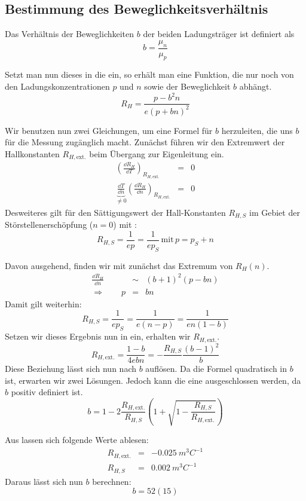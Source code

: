 \subsection{Bestimmung des Beweglichkeitsverhältnis}
Das Verhältnis der Beweglichkeiten $b$ der beiden Ladungsträger ist definiert als
\begin{equation}
 b = \frac{μ_n}{μ_p}
\end{equation}

Setzt man nun dieses in die  ein, so erhält man eine Funktion,
die nur noch von den Ladungskonzentrationen $p$ und $n$ sowie der Beweglichkeit $b$
abhängt.
\begin{equation}
 R_H = \frac{p-b^2n}{e(p+bn)^2}
 \label{eqn:hallkonst_b}
\end{equation}

Wir benutzen nun zwei Gleichungen, um eine Formel für $b$ herzuleiten, die uns
$b$ für die Messung zugänglich macht.
Zunächst führen wir den Extremwert der Hallkonstanten $R_{H,\mbox{ext.}}$ beim
Übergang zur Eigenleitung ein.
\begin{eqnarray}
 \left(\frac{\dd{R_H}}{\dd{T}}\right)_{R_{H,\mbox{ext.}}} &=& 0 \\
 \underbrace{\frac{\dd{T}}{\dd{n}}}_{\neq 0} \left(\frac{\dd{R_H}}{\dd{n}}\right)_{R_{H,\mbox{ext.}}} &=& 0
\end{eqnarray}
Desweiteres gilt für den Sättigungswert der Hall-Konstanten $R_{H,S}$ im Gebiet
der Störstellenerschöpfung ($n = 0$) mit :
\begin{equation}
 R_{H,S} = \frac{1}{ep} = \frac{1}{ep_S}\,\mbox{mit}\, p = p_S + n
\end{equation}

Davon ausgehend, finden wir mit \cite{maxima} zunächst das Extremum von $R_H(n)$.
\begin{eqnarray}
 \frac{\dd{R_H}}{\dd{n}} &\sim& (b+1)^2(p-bn) \\
\Rightarrow\qquad p &=& bn
\end{eqnarray}
Damit gilt weiterhin:
\begin{equation}
 R_{H,S} = \frac{1}{ep_S} = \frac{1}{e(n-p)} = \frac{1}{en(1-b)}
\end{equation}
Setzen wir dieses Ergebnis nun in  ein, erhalten wir $R_{H,\mbox{ext.}}$.
\begin{equation}
 R_{H,\mbox{ext.}} = \frac{1-b}{4ebn} = - \frac{R_{H,S}}{}\frac{(b-1)^2}{b}
\end{equation}
Diese Beziehung lässt sich nun nach $b$ auflösen. Da die Formel quadratisch in $b$
ist, erwarten wir zwei Lösungen. Jedoch kann die eine ausgeschlossen werden, da $b$
positiv definiert ist.
\begin{equation}
 b = 1-2\frac{R_{H,\mbox{ext.}}}{R_{H,S}}\left(1+\sqrt{1-\frac{R_{H,S}}{R_{H,\mbox{ext.}}}}\right)
\end{equation}

Aus  lassen sich folgende Werte ablesen:
\begin{eqnarray}
 R_{H,\mbox{ext.}} &=& \SI{-0.025}{m^3C^{-1}}\\
 R_{H,S} &=&  \SI{0.002}{m^3C^{-1}}
\end{eqnarray}
Daraus lässt sich nun $b$ berechnen:
\begin{equation}
 b = \si{52(15)}
\end{equation}
